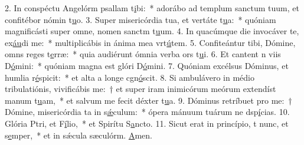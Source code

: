 2. In conspéctu Angelórm psallam t\uline{i}bi:~* adorábo ad templum sanctum tuum, et confitébor nómin t\uline{u}o.
3. Super misericórdia tua, et vertáte t\uline{u}a:~* quóniam magnificásti super omne, nomen sanctm t\uline{u}um.
4. In quacúmque die invocáver te, ex\uline{áu}di me:~* multiplicábis in ánima mea vrt\uline{ú}tem.
5. Confiteántur tibi, Dómine, omns reges t\uline{e}rræ:~* quia audiérunt ómnia verba ors t\uline{u}i.
6. Et cantent n viis D\uline{ó}mini:~* quóniam magna est glóri D\uline{ó}mini.
7. Quóniam excélsus Dóminus, et humlia r\uline{é}spicit:~* et alta a longe cgn\uline{ó}scit.
8. Si ambulávero in médio tribulatiónis, vivificábis me:~† et super iram inimicórum meórum extendíst manum t\uline{u}am,~* et salvum me fecit déxter t\uline{u}a.
9. Dóminus retríbuet pro me:~† Dómine, misericórdia ta in s\uline{ǽ}culum:~* ópera mánuum tuárum ne dsp\uline{í}cias.
10. Glória Ptri, et F\uline{í}lio,~* et Spirítu S\uline{a}ncto.
11. Sicut erat in princípio, t nunc, et s\uline{e}mper,~* et in sǽcula sæculórm. \uline{A}men.
